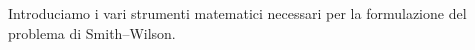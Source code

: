 \documentclass[11pt,a4paper]{article}
\theoremstyle{plain}
\theoremstyle{definition}
\theoremstyle{remark}
\newcommand{\UFR}{\mathrm{UFR}}
\newcommand{\FSP}{\mathrm{FSP}}
\newcommand{\defeq}{\coloneqq}
\newcommand{\LLP}{\mathrm{LLP}}
\begin{document}
Introduciamo i vari strumenti matematici necessari per la formulazione del problema di Smith--Wilson.

\end{document}
